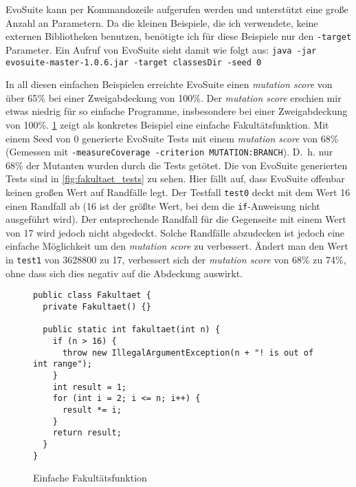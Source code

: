 \documentclass[a4paper,11pt]{article}
\begin{document}
EvoSuite kann per Kommandozeile aufgerufen werden und unterstützt eine große Anzahl an Parametern.
Da die kleinen Beispiele, die ich verwendete, keine externen Bibliotheken benutzen, benötigte ich für diese Beispiele nur den \texttt{-target} Parameter.
Ein Aufruf von EvoSuite sieht damit wie folgt aus: \texttt{java -jar evosuite-master-1.0.6.jar -target classesDir -seed 0}

In all diesen einfachen Beispielen erreichte EvoSuite einen \textit{mutation score} von über 65\% bei einer Zweigabdeckung von 100\%.
Der \textit{mutation score} erschien mir etwas niedrig für so einfache Programme, insbesondere bei einer Zweigabdeckung von 100\%.
\cref{fig:fakultaet} zeigt als konkretes Beispiel eine einfache Fakultätsfunktion.
Mit einem Seed von 0 generierte EvoSuite Tests mit einem \textit{mutation score} von 68\% (Gemessen mit \texttt{-measureCoverage -criterion MUTATION:BRANCH}).
D.~h. nur 68\% der Mutanten wurden durch die Tests getötet.
Die von EvoSuite generierten Tests sind in \cref{fig:fakultaet_tests} zu sehen.
Hier fällt auf, dass EvoSuite offenbar keinen großen Wert auf Randfälle legt.
Der Testfall \texttt{test0} deckt mit dem Wert 16 einen Randfall ab (16 ist der größte Wert, bei dem die \lstinline{if}-Anweisung nicht ausgeführt wird).
Der entsprechende Randfall für die Gegenseite mit einem Wert von 17 wird jedoch nicht abgedeckt.
Solche Randfälle abzudecken ist jedoch eine einfache Möglichkeit um den \textit{mutation score} zu verbessert.
Ändert man den Wert in \texttt{test1} von 3628800 zu 17, verbessert sich der \textit{mutation score} von 68\% zu 74\%, ohne dass sich dies negativ auf die Abdeckung auswirkt.

\begin{figure}[h]
	\begin{lstlisting}[basicstyle=\ttfamily\tiny]
public class Fakultaet {
  private Fakultaet() {}

  public static int fakultaet(int n) {
    if (n > 16) {
      throw new IllegalArgumentException(n + "! is out of int range");
    }
    int result = 1;
    for (int i = 2; i <= n; i++) {
      result *= i;
    }
    return result;
  }
}
	\end{lstlisting}
	\caption{Einfache Fakultätsfunktion}
	\label{fig:fakultaet}
\end{figure}
\end{document}

